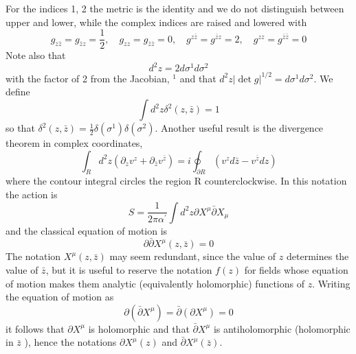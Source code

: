 For the indices 1, 2 the metric is the identity and we do not distinguish
between upper and lower, while the complex indices are raised and lowered
with
\begin{equation}
g_{z \bar{z}}=g_{\bar{z} z}=\frac{1}{2}, \quad g_{z z}=g_{\bar{z} \bar{z}}=0, \quad g^{z \bar{z}}=g^{\bar{z} z}=2, \quad g^{z z}=g^{\bar{z} \bar{z}}=0
\end{equation}
Note also that
\begin{equation}
d^{2} z=2 d \sigma^{1} d \sigma^{2}
\end{equation}
with the factor of 2 from the Jacobian, ${ }^{1}$ and that $d^{2} z|\operatorname{det} g|^{1 / 2}=d \sigma^{1} d \sigma^{2}$. We define
\begin{equation}
\int d^{2} z \delta^{2}(z, \bar{z})=1
\end{equation}
so that $\delta^{2}(z, \bar{z})=\frac{1}{2} \delta\left(\sigma^{1}\right) \delta\left(\sigma^{2}\right) .$ Another useful result is the divergence
theorem in complex coordinates,
\begin{equation}
\int_{R} d^{2} z\left(\partial_{z} v^{z}+\partial_{\bar{z}} v^{\bar{z}}\right)=i \oint_{\partial R}\left(v^{z} d \bar{z}-v^{\bar{z}} d z\right)
\end{equation}
where the contour integral circles the region R counterclockwise.
In this notation the action is
\begin{equation}
S=\frac{1}{2 \pi \alpha^{\prime}} \int d^{2} z \partial X^{\mu} \bar{\partial} X_{\mu}
\end{equation}
and the classical equation of motion is
\begin{equation}
\partial \bar{\partial} X^{\mu}(z, \bar{z})=0
\end{equation}
The notation $X^{\mu}(z, \bar{z})$ may seem redundant, since the value of $z$ determines the value of $\bar{z}$, but it is useful to reserve the notation $f(z)$ for fields whose equation of motion makes them analytic (equivalently holomorphic) functions of $z$. Writing the equation of motion as
\begin{equation}
\partial\left(\bar{\partial} X^{\mu}\right)=\bar{\partial}\left(\partial X^{\mu}\right)=0
\end{equation}
it follows that $\partial X^{\mu}$ is holomorphic and that $\bar{\partial} X^{\mu}$ is antiholomorphic (holomorphic in $\bar{z}$ ), hence the notations $\partial X^{\mu}(z)$ and $\bar{\partial} X^{\mu}(\bar{z})$.

